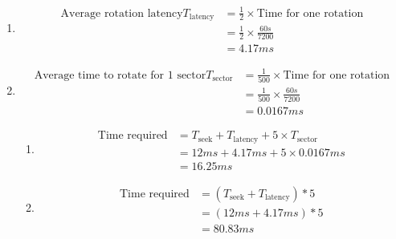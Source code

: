 \documentclass{article}
\begin{document}
\begin{enumerate}[label=(\alph*)]
    \item \begin{align*}
              \text{Average rotation latency} T_\text{latency} & = \frac{1}{2} \times \text{Time for one rotation} \\
                                                               & = \frac{1}{2} \times \frac{60s}{7200}             \\
                                                               & = 4.17ms
          \end{align*}
    \item \begin{align*}
              \text{Average time to rotate for 1 sector} T_\text{sector} & = \frac{1}{500} \times \text{Time for one rotation} \\
                                                                         & = \frac{1}{500} \times \frac{60s}{7200}             \\
                                                                         & = 0.0167ms
          \end{align*}
          \begin{enumerate}[label=(\roman*)]
              \item \begin{align*}
                        \text{Time required} & = T_\text{seek} + T_\text{latency} + 5 \times T_\text{sector} \\
                                             & = 12ms + 4.17ms + 5 \times 0.0167ms                           \\
                                             & = 16.25ms
                    \end{align*}
              \item \begin{align*}
                        \text{Time required} & = (T_\text{seek} + T_\text{latency}) * 5 \\
                                             & = (12ms + 4.17ms) * 5                    \\
                                             & = 80.83ms
                    \end{align*}
          \end{enumerate}
\end{enumerate}
\end{document}
